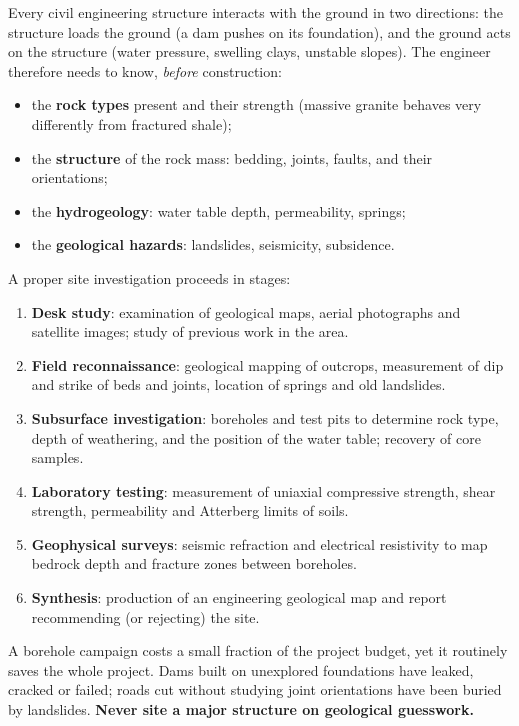 \documentclass[11pt]{article}
\begin{document}
Every civil engineering structure interacts with the ground in two directions: the structure loads the ground (a dam pushes on its foundation), and the ground acts on the structure (water pressure, swelling clays, unstable slopes). The engineer therefore needs to know, \emph{before} construction:

\begin{itemize}
\item the \textbf{rock types} present and their strength (massive granite behaves very differently from fractured shale);
\item the \textbf{structure} of the rock mass: bedding, joints, faults, and their orientations;
\item the \textbf{hydrogeology}: water table depth, permeability, springs;
\item the \textbf{geological hazards}: landslides, seismicity, subsidence.
\end{itemize}

\begin{methode}
A proper site investigation proceeds in stages:
\begin{enumerate}
\item \textbf{Desk study}: examination of geological maps, aerial photographs and satellite images; study of previous work in the area.
\item \textbf{Field reconnaissance}: geological mapping of outcrops, measurement of dip and strike of beds and joints, location of springs and old landslides.
\item \textbf{Subsurface investigation}: boreholes and test pits to determine rock type, depth of weathering, and the position of the water table; recovery of core samples.
\item \textbf{Laboratory testing}: measurement of uniaxial compressive strength, shear strength, permeability and Atterberg limits of soils.
\item \textbf{Geophysical surveys}: seismic refraction and electrical resistivity to map bedrock depth and fracture zones between boreholes.
\item \textbf{Synthesis}: production of an engineering geological map and report recommending (or rejecting) the site.
\end{enumerate}
\end{methode}

\begin{attention}
A borehole campaign costs a small fraction of the project budget, yet it routinely saves the whole project. Dams built on unexplored foundations have leaked, cracked or failed; roads cut without studying joint orientations have been buried by landslides. \textbf{Never site a major structure on geological guesswork.}
\end{attention}
\end{document}
